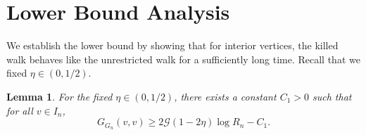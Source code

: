 \documentclass{article}
\numberwithin{equation}{section}
\newtheorem{lemma}[theorem]{Lemma}
\theoremstyle{definition}
\theoremstyle{remark}
\newcommand{\cG}{\mathcal{G}}
\begin{document}
\section{Lower Bound Analysis}\label{sec:lower_bound}

We establish the lower bound by showing that for interior vertices, the killed walk behaves like the unrestricted walk for a sufficiently long time.
Recall that we fixed $\eta \in (0, 1/2)$.

\begin{lemma}\label{lem:lower}
For the fixed $\eta \in (0,1/2)$, there exists a constant $C_1 > 0$ such that for all $v \in I_n$,
\[
G_{G_n}(v,v) \geq 2\cG(1-2\eta)\log R_n - C_1.
\]
\end{lemma}
\end{document}
